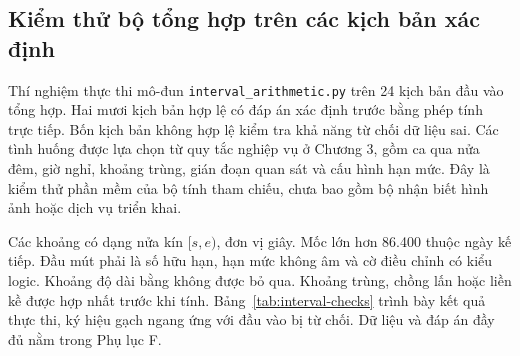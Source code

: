 \subsection{Kiểm thử bộ tổng hợp trên các kịch bản xác định}
\label{sec:interval-evaluation}
Thí nghiệm thực thi mô-đun \texttt{interval\_arithmetic.py} trên 24 kịch bản đầu vào tổng hợp. Hai mươi kịch bản hợp lệ có đáp án xác định trước bằng phép tính trực tiếp. Bốn kịch bản không hợp lệ kiểm tra khả năng từ chối dữ liệu sai. Các tình huống được lựa chọn từ quy tắc nghiệp vụ ở Chương 3, gồm ca qua nửa đêm, giờ nghỉ, khoảng trùng, gián đoạn quan sát và cấu hình hạn mức. Đây là kiểm thử phần mềm của bộ tính tham chiếu, chưa bao gồm bộ nhận biết hình ảnh hoặc dịch vụ triển khai.

Các khoảng có dạng nửa kín $[s,e)$, đơn vị giây. Mốc lớn hơn 86.400 thuộc ngày kế tiếp. Đầu mút phải là số hữu hạn, hạn mức không âm và cờ điều chỉnh có kiểu logic. Khoảng độ dài bằng không được bỏ qua. Khoảng trùng, chồng lấn hoặc liền kề được hợp nhất trước khi tính. Bảng~\ref{tab:interval-checks} trình bày kết quả thực thi, ký hiệu gạch ngang ứng với đầu vào bị từ chối. Dữ liệu và đáp án đầy đủ nằm trong Phụ lục F.

